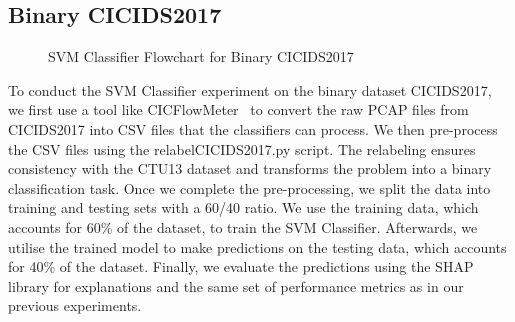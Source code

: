 \subsection{Binary CICIDS2017}\label{subsec:SVMClassifierBinaryCICIDS2017}
\begin{figure}[H]
\centering
{}
\caption{SVM Classifier Flowchart for Binary CICIDS2017}\label{fig:SVMFlowBinaryCICIDS2017}
\end{figure}

To conduct the SVM Classifier experiment on the binary dataset CICIDS2017, we first use a tool like CICFlowMeter~\cite{lashkari2017characterization} to convert the raw PCAP files from CICIDS2017 into CSV files that the classifiers can process. We then pre-process the CSV files using the relabelCICIDS2017.py script. The relabeling ensures consistency with the CTU13 dataset and transforms the problem into a binary classification task. Once we complete the pre-processing, we split the data into training and testing sets with a 60/40 ratio. We use the training data, which accounts for 60\% of the dataset, to train the SVM Classifier. Afterwards, we utilise the trained model to make predictions on the testing data, which accounts for 40\% of the dataset. Finally, we evaluate the predictions using the SHAP library for explanations and the same set of performance metrics as in our previous experiments.

